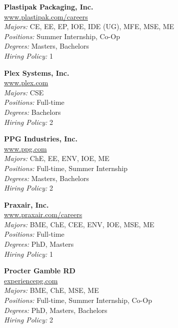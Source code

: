 \documentclass{article}
\begin{document}
\begin{center}
\begin{multicols}{3}
\begin{minipage}{.9\columnwidth}{\Large\bf Plastipak Packaging, Inc. }\\
	\url{www.plastipak.com/careers}\\
	\emph{Majors:} CE, EE, EP, IOE, IDE (UG), MFE, MSE, ME\\
	\emph{Positions:} Summer Internship, Co-Op\\
	\emph{Degrees:} Masters, Bachelors\\
	\emph{Hiring Policy:} 1\\
\end{minipage}
 
\begin{minipage}{.9\columnwidth}{\Large\bf Plex Systems, Inc. }\\
	\url{www.plex.com}\\
	\emph{Majors:} CSE\\
	\emph{Positions:} Full-time\\
	\emph{Degrees:} Bachelors\\
	\emph{Hiring Policy:} 2\\
\end{minipage}
 
\begin{minipage}{.9\columnwidth}{\Large\bf PPG Industries, Inc. }\\
	\url{www.ppg.com}\\
	\emph{Majors:} ChE, EE, ENV, IOE, ME\\
	\emph{Positions:} Full-time, Summer Internship\\
	\emph{Degrees:} Masters, Bachelors\\
	\emph{Hiring Policy:} 2\\
\end{minipage}
 
\begin{minipage}{.9\columnwidth}{\Large\bf Praxair, Inc. }\\
	\url{www.praxair.com/careers}\\
	\emph{Majors:} BME, ChE, CEE, ENV, IOE, MSE, ME\\
	\emph{Positions:} Full-time\\
	\emph{Degrees:} PhD, Masters\\
	\emph{Hiring Policy:} 1\\
\end{minipage}
 
\begin{minipage}{.9\columnwidth}{\Large\bf Procter Gamble RD }\\
	\url{experiencepg.com}\\
	\emph{Majors:} BME, ChE, MSE, ME\\
	\emph{Positions:} Full-time, Summer Internship, Co-Op\\
	\emph{Degrees:} PhD, Masters, Bachelors\\
	\emph{Hiring Policy:} 2\\
\end{minipage}
 

\end{multicols}
\end{center}
\end{document}
